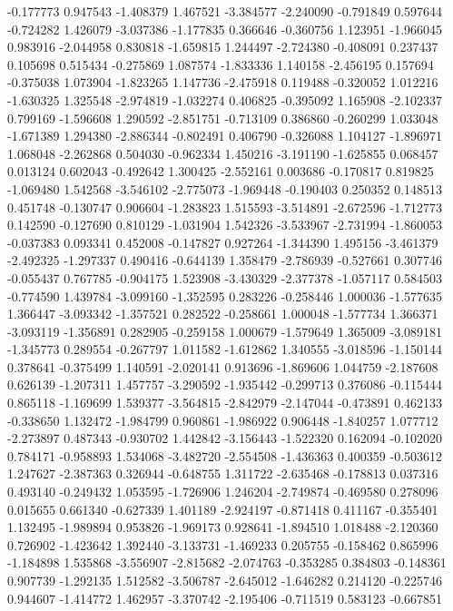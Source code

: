-0.177773
0.947543
-1.408379
1.467521
-3.384577
-2.240090
-0.791849
0.597644
-0.724282
1.426079
-3.037386
-1.177835
0.366646
-0.360756
1.123951
-1.966045
0.983916
-2.044958
0.830818
-1.659815
1.244497
-2.724380
-0.408091
0.237437
0.105698
0.515434
-0.275869
1.087574
-1.833336
1.140158
-2.456195
0.157694
-0.375038
1.073904
-1.823265
1.147736
-2.475918
0.119488
-0.320052
1.012216
-1.630325
1.325548
-2.974819
-1.032274
0.406825
-0.395092
1.165908
-2.102337
0.799169
-1.596608
1.290592
-2.851751
-0.713109
0.386860
-0.260299
1.033048
-1.671389
1.294380
-2.886344
-0.802491
0.406790
-0.326088
1.104127
-1.896971
1.068048
-2.262868
0.504030
-0.962334
1.450216
-3.191190
-1.625855
0.068457
0.013124
0.602043
-0.492642
1.300425
-2.552161
0.003686
-0.170817
0.819825
-1.069480
1.542568
-3.546102
-2.775073
-1.969448
-0.190403
0.250352
0.148513
0.451748
-0.130747
0.906604
-1.283823
1.515593
-3.514891
-2.672596
-1.712773
0.142590
-0.127690
0.810129
-1.031904
1.542326
-3.533967
-2.731994
-1.860053
-0.037383
0.093341
0.452008
-0.147827
0.927264
-1.344390
1.495156
-3.461379
-2.492325
-1.297337
0.490416
-0.644139
1.358479
-2.786939
-0.527661
0.307746
-0.055437
0.767785
-0.904175
1.523908
-3.430329
-2.377378
-1.057117
0.584503
-0.774590
1.439784
-3.099160
-1.352595
0.283226
-0.258446
1.000036
-1.577635
1.366447
-3.093342
-1.357521
0.282522
-0.258661
1.000048
-1.577734
1.366371
-3.093119
-1.356891
0.282905
-0.259158
1.000679
-1.579649
1.365009
-3.089181
-1.345773
0.289554
-0.267797
1.011582
-1.612862
1.340555
-3.018596
-1.150144
0.378641
-0.375499
1.140591
-2.020141
0.913696
-1.869606
1.044759
-2.187608
0.626139
-1.207311
1.457757
-3.290592
-1.935442
-0.299713
0.376086
-0.115444
0.865118
-1.169699
1.539377
-3.564815
-2.842979
-2.147044
-0.473891
0.462133
-0.338650
1.132472
-1.984799
0.960861
-1.986922
0.906448
-1.840257
1.077712
-2.273897
0.487343
-0.930702
1.442842
-3.156443
-1.522320
0.162094
-0.102020
0.784171
-0.958893
1.534068
-3.482720
-2.554508
-1.436363
0.400359
-0.503612
1.247627
-2.387363
0.326944
-0.648755
1.311722
-2.635468
-0.178813
0.037316
0.493140
-0.249432
1.053595
-1.726906
1.246204
-2.749874
-0.469580
0.278096
0.015655
0.661340
-0.627339
1.401189
-2.924197
-0.871418
0.411167
-0.355401
1.132495
-1.989894
0.953826
-1.969173
0.928641
-1.894510
1.018488
-2.120360
0.726902
-1.423642
1.392440
-3.133731
-1.469233
0.205755
-0.158462
0.865996
-1.184898
1.535868
-3.556907
-2.815682
-2.074763
-0.353285
0.384803
-0.148361
0.907739
-1.292135
1.512582
-3.506787
-2.645012
-1.646282
0.214120
-0.225746
0.944607
-1.414772
1.462957
-3.370742
-2.195406
-0.711519
0.583123
-0.667851
